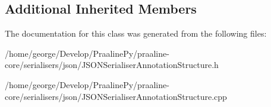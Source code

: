\subsection*{Additional Inherited Members}


The documentation for this class was generated from the following files\+:\begin{DoxyCompactItemize}
\item 
/home/george/\+Develop/\+Praaline\+Py/praaline-\/core/serialisers/json/J\+S\+O\+N\+Serialiser\+Annotation\+Structure.\+h\item 
/home/george/\+Develop/\+Praaline\+Py/praaline-\/core/serialisers/json/J\+S\+O\+N\+Serialiser\+Annotation\+Structure.\+cpp\end{DoxyCompactItemize}
